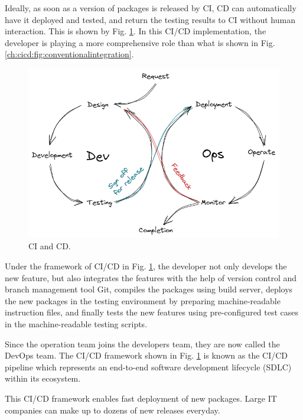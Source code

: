 Ideally, as soon as a version of packages is released by CI, CD can automatically have it deployed and tested, and return the testing results to CI without human interaction. This is shown by Fig. \ref{ch:cicd:fig:cd}. In this CI/CD implementation, the developer is playing a more comprehensive role than what is shown in Fig. \ref{ch:cicd:fig:conventionalintegration}.
\begin{figure}[htbp]
	\centering
	\includegraphics[width=350pt]{chapters/ap/figures/cd.png}
	\caption{CI and CD.} \label{ch:cicd:fig:cd}
\end{figure}

Under the framework of CI/CD in Fig. \ref{ch:cicd:fig:cd}, the developer not only develops the new feature, but also integrates the features with the help of version control and branch management tool Git, compiles the packages using build server, deploys the new packages in the testing environment by preparing machine-readable instruction files, and finally tests the new features using pre-configured test cases in the machine-readable testing scripts.

Since the operation team joins the developers team, they are now called the DevOps team. The CI/CD framework shown in Fig. \ref{ch:cicd:fig:cd} is known as the CI/CD pipeline which represents an end-to-end software development lifecycle (SDLC) within its ecosystem.

This CI/CD framework enables fast deployment of new packages. Large IT companies can make up to dozens of new releases everyday.
